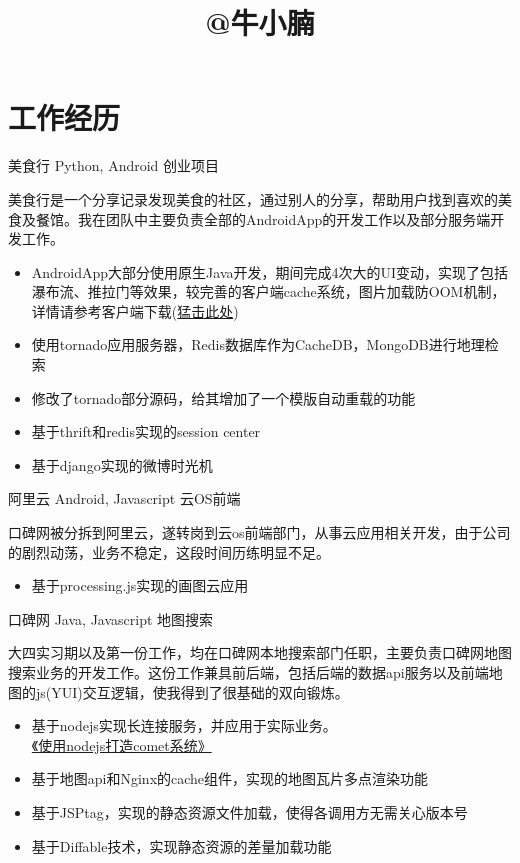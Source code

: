 \documentclass[12pt,a4paper]{moderncv}
\title{@牛小腩}               %
\begin{document}
\maketitle

\section{工作经历}
\renewcommand{\baselinestretch}{1.2}

{美食行}
{Python, Android}
{创业项目}{}
{美食行是一个分享记录发现美食的社区，通过别人的分享，帮助用户找到喜欢的美食及餐馆。我在团队中主要负责全部的AndroidApp的开发工作以及部分服务端开发工作。{}%
\begin{itemize}%
\item AndroidApp大部分使用原生Java开发，期间完成4次大的UI变动，实现了包括瀑布流、推拉门等效果，较完善的客户端cache系统，图片加载防OOM机制，详情请参考客户端下载(\href{http://meishixing.com/files/meishixing_last.apk}{猛击此处})
\item 使用tornado应用服务器，Redis数据库作为CacheDB，MongoDB进行地理检索
\item 修改了tornado部分源码，给其增加了一个模版自动重载的功能
\item 基于thrift和redis实现的session center
\item 基于django实现的微博时光机
\end{itemize}}

\vspace*{\baselineskip}
{阿里云}
{Android, Javascript}
{云OS前端}{}
{口碑网被分拆到阿里云，遂转岗到云os前端部门，从事云应用相关开发，由于公司的剧烈动荡，业务不稳定，这段时间历练明显不足。{}%
\begin{itemize}%
\item 基于processing.js实现的画图云应用
\end{itemize}}

\vspace*{\baselineskip}
{口碑网}
{Java, Javascript}
{地图搜索}{}
{大四实习期以及第一份工作，均在口碑网本地搜索部门任职，主要负责口碑网地图搜索业务的开发工作。这份工作兼具前后端，包括后端的数据api服务以及前端地图的js(YUI)交互逻辑，使我得到了很基础的双向锻炼。{}%
\begin{itemize}%
\item 基于nodejs实现长连接服务，并应用于实际业务。\href{http://www.mhtml5.com/events/hzsl6}{《使用nodejs打造comet系统》}
\item 基于地图api和Nginx的cache组件，实现的地图瓦片多点渲染功能
\item 基于JSPtag，实现的静态资源文件加载，使得各调用方无需关心版本号
\item 基于Diffable技术，实现静态资源的差量加载功能
\end{itemize}}
\end{document}
